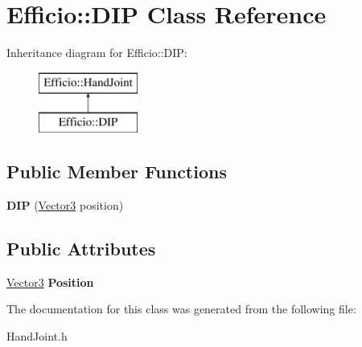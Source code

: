 \hypertarget{class_efficio_1_1_d_i_p}{}\section{Efficio\+:\+:D\+IP Class Reference}
\label{class_efficio_1_1_d_i_p}
Inheritance diagram for Efficio\+:\+:D\+IP\+:\begin{figure}[H]
\begin{center}
\leavevmode
\includegraphics[height=2.000000cm]{class_efficio_1_1_d_i_p}
\end{center}
\end{figure}
\subsection*{Public Member Functions}
\begin{DoxyCompactItemize}
\item 
{\bfseries D\+IP} (\hyperlink{class_efficio_1_1_vector3}{Vector3} position)\hypertarget{class_efficio_1_1_d_i_p_a75b38a33774d216c9ba69a5cd66e3b41}{}\label{class_efficio_1_1_d_i_p_a75b38a33774d216c9ba69a5cd66e3b41}

\end{DoxyCompactItemize}
\subsection*{Public Attributes}
\begin{DoxyCompactItemize}
\item 
\hyperlink{class_efficio_1_1_vector3}{Vector3} {\bfseries Position}\hypertarget{class_efficio_1_1_d_i_p_a9d86982fe4f209e4bfe26badf3e6d33f}{}\label{class_efficio_1_1_d_i_p_a9d86982fe4f209e4bfe26badf3e6d33f}

\end{DoxyCompactItemize}


The documentation for this class was generated from the following file\+:\begin{DoxyCompactItemize}
\item 
Hand\+Joint.\+h\end{DoxyCompactItemize}

